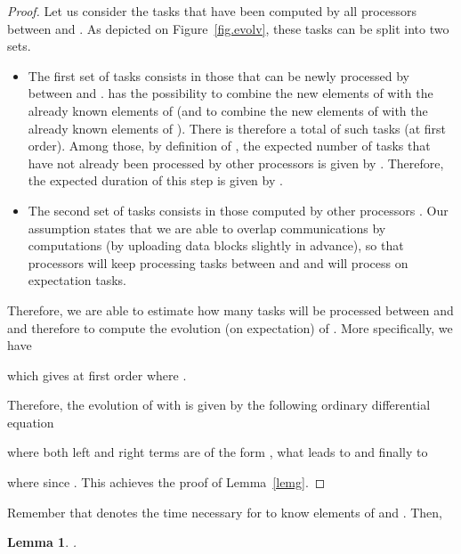 \documentclass[a4paper,10pt]{article}
\newtheorem{lemma}[theorem]{Lemma}
\begin{document}
\begin{proof}
Let us consider the tasks that have been computed by all processors
between  and . As depicted on
Figure~\ref{fig.evolv}, these tasks can be split into two sets.
\begin{itemize}
\item The first set of tasks consists in those that can be newly
  processed by  between  and .  has the
  possibility to combine the  new elements of  with the  already known elements of  (and to combine the  new
  elements of  with the  already known elements of ). There
  is therefore a total of  such tasks (at first
  order). Among those, by definition of , the expected number of
  tasks that have not already been processed by other processors is
  given by . Therefore, the expected duration of
  this step is given by .

\item The second set of tasks consists in those computed by other
  processors . Our assumption states
  that we are able to overlap communications by computations (by
  uploading data blocks slightly in advance), so that processors
   will keep processing tasks between  and
   and will process on expectation  tasks.

\end{itemize}
Therefore, we are able to estimate how many tasks will be processed
between  and  and therefore to compute the
evolution (on expectation) of . More specifically, we have


which gives at first order
 where .

Therefore, the evolution of  with  is given by the following
ordinary differential equation

where both left and right terms are of the form , what leads to
 and finally to

where  since . This achieves the proof of
Lemma~\ref{lemg}. 
\end{proof}
\medskip

Remember that  denotes the time necessary for  to know
 elements of  and . Then,

\begin{lemma} 
  \label{lemT} . 
\end{lemma}
\end{document}
